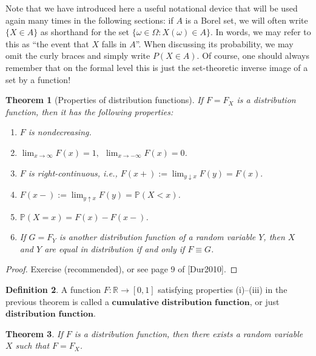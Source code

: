 \documentclass[11pt]{report}
\newcommand{\R}{\mathbb{R}}
\theoremstyle{plain}
\newtheorem{thm}{Theorem}[chapter]
\theoremstyle{definition}
\newtheorem{defn}[thm]{Definition}
\begin{document}
Note that we have introduced here a useful notational
device that will be used again many times in the
following sections: if $A$ is a Borel set, we will
often write $\{X \in A\}$ as shorthand for the set
$\{ \omega \in \Omega : X(\omega) \in A \}$. In
words, we may refer to this as ``the event that $X$
falls in $A$''. When discussing its probability, we
may omit the curly braces and simply write
$P(X\in A)$. Of course, one should always remember
that on the formal level this is just the
set-theoretic inverse image of a set by a function!

\begin{thm}[Properties of distribution functions]
If $F=F_X$ is a distribution function, then it has
the following properties:

\begin{enumerate}[label=(\roman*)]
\item $F$ is nondecreasing.

\item $\lim_{x\to\infty} F(x) = 1, \ \ \lim_{x\to-\infty}
F(x) = 0$.

\item $F$ is right-continuous, i.e.,
$F(x+) := \lim_{y\downarrow x} F(y) = F(x).$

\item $F(x-) := \lim_{y\uparrow x} F(y) = \mathbb{P}(X <
x)$.

\item $\mathbb{P}(X=x) = F(x) - F(x-)$.

\item If $G=F_Y$ is another distribution function of a
random variable $Y$, then $X$ and $Y$ are equal in
distribution if and only if $F \equiv G$.
\end{enumerate}

\end{thm}

\begin{proof}
Exercise (recommended), or see page 9 of [Dur2010].
\end{proof}

\begin{defn}
A function $F:\R\to[0,1]$ satisfying properties
(i)--(iii) in the previous theorem is called a
$\textbf{cumulative distribution function}$, or just
$\textbf{distribution function}$.
\end{defn}

\begin{thm}
\label{thm-rvexistence}
If $F$ is a distribution function, then there exists
a random variable $X$ such that $F=F_X$.
\end{thm}
\end{document}
